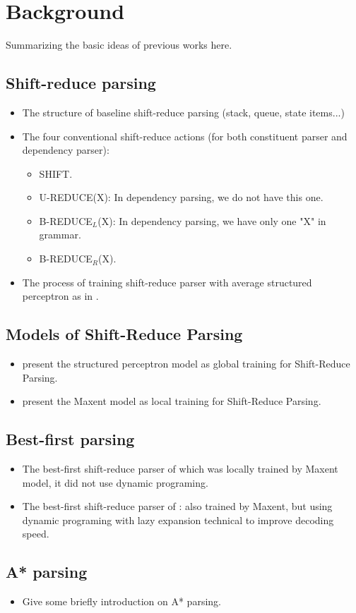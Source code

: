 \section {Background}
	Summarizing the basic ideas of previous works here.
\subsection{Shift-reduce parsing}
	\begin{itemize}
		\item The structure of baseline shift-reduce parsing (stack, queue, state items...)
		\item The four conventional shift-reduce actions (for both constituent parser and dependency parser):
		\begin{itemize}
			\item SHIFT.
			\item U-REDUCE(X): In dependency parsing, we do not have this one.
			\item B-REDUCE$_L$(X): In dependency parsing, we have only one "X" in grammar.
			\item B-REDUCE$_R$(X).
		\end{itemize}
		\item The process of training shift-reduce parser with average structured perceptron as in \cite{2004Collins}.
	\end{itemize}
\subsection{Models of Shift-Reduce Parsing}	
	\begin{itemize}
		\item present the structured perceptron model as global training for Shift-Reduce Parsing.
		\item present the Maxent model as local training for Shift-Reduce Parsing.
	\end{itemize}
\subsection{Best-first parsing}
	\begin{itemize}
		\item The best-first shift-reduce parser of \cite{2006Sagae} which was locally trained by Maxent model, it did not use dynamic programing.
		\item The best-first shift-reduce parser of \cite{2013Zhao}: also trained by Maxent, but using dynamic programing with lazy expansion technical to improve decoding speed.
	\end{itemize}
\subsection{A* parsing}
	\begin{itemize}
		\item Give some briefly introduction on A* parsing.
	\end{itemize}